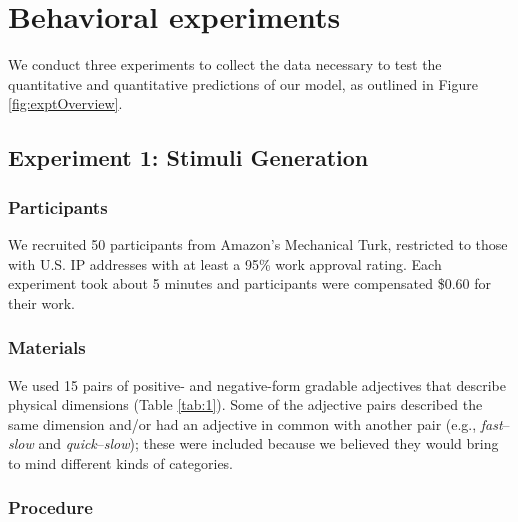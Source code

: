 \documentclass[doc]{apa6}
\begin{document}

\section{Behavioral experiments}

We conduct three experiments to collect the data necessary to test the quantitative and quantitative predictions of our model, as outlined in Figure \ref{fig:exptOverview}. 

\subsection{Experiment 1: Stimuli Generation}

\subsubsection{Participants}

We recruited 50 participants from Amazon's Mechanical
Turk, restricted to those with U.S. IP addresses with at least a
95\% work approval rating. Each experiment took about 5 minutes and
participants were compensated \$0.60 for their work.

\subsubsection{Materials}

We used 15 pairs of positive- and negative-form gradable adjectives that describe physical dimensions (Table \ref{tab:1}).
Some of the adjective pairs described the same dimension and/or had an adjective in common with another pair (e.g., \emph{fast}--\emph{slow} and \emph{quick}--\emph{slow}); these were included because we believed they would bring to mind different kinds of categories.

\subsubsection{Procedure}
\end{document}
